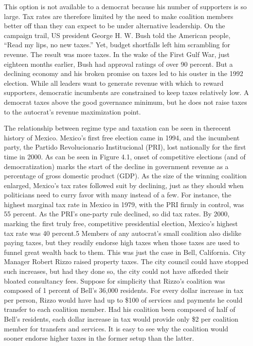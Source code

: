 \documentclass[10pt]{article}
\begin{document}
{\large This option is not available to a democrat because his number of
supporters is so large. Tax rates are therefore limited by the need to make
coalition members better off than they can expect to be under alternative
leadership. On the campaign trail, US president George H. W. Bush told the
American people, ``Read my lips, no new taxes.'' Yet, budget shortfalls left him
scrambling for revenue. The result was more taxes. In the wake of the First Gulf
War, just eighteen months earlier, Bush had approval ratings of over 90 percent.
But a declining economy and his broken promise on taxes led to his ouster in the
1992 election. While all leaders want to generate revenue with which to reward
supporters, democratic incumbents are constrained to keep taxes relatively low. A
democrat taxes above the good governance minimum, but he does not raise taxes to
the autocrat's revenue maximization point.}

{\large The relationship between regime type and taxation can be seen in
therecent history of Mexico. Mexico's first free election came in 1994, and the
incumbent party, the Partido Revolucionario Institucional (PRI), lost nationally
for the first time in 2000. As can be seen in Figure 4.1, onset of competitive
elections (and of democratization) marks the start of the decline in government
revenue as a percentage of gross domestic product (GDP). As the size of the
winning coalition enlarged, Mexico's tax rates followed suit by declining, just
as they should when politicians need to curry favor with many instead of a few.
For instance, the highest marginal tax rate in Mexico in 1979, with the PRI
firmly in control, was 55 percent. As the PRI's one-party rule declined, so did
tax rates. By 2000, marking the first truly free, competitive presidential
election, Mexico's highest tax rate was 40 percent.5 Members of any autocrat's
small coalition also dislike paying taxes, but they readily endorse high taxes
when those taxes are used to funnel great wealth back to them. This was just the
case in Bell, California. City Manager Robert Rizzo raised property taxes. The
city council could have stopped such increases, but had they done so, the city
could not have afforded their bloated consultancy fees. Suppose for simplicity
that Rizzo's coalition was composed of 1 percent of Bell's 36,000 residents. For
every dollar increase in tax per person, Rizzo would have had up to \$100 of
services and payments he could transfer to each coalition member. Had his
coalition been composed of half of Bell's residents, each dollar increase in tax
would provide only \$2 per coalition member for transfers and services. It is
easy to see why the coalition would sooner endorse higher taxes in the former
setup than the latter.}
\end{document}
